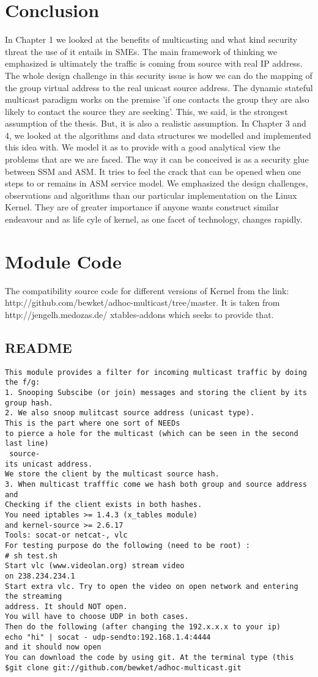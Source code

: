 \chapter{Conclusion}
In Chapter 1 we looked at the benefits of multicasting and what kind security
threat the use of it entails in SMEs. The main framework of thinking we emphasized
is ultimately the traffic is coming from source with real IP address. The whole
design challenge in this security issue is how we can do the mapping of the group
virtual address to the real unicast source address. The dynamic stateful multicast
paradigm works on the premise 'if one contacts the group they are also likely to
contact the source they are seeking'. This, we said, is the strongest assumption of
the thesis. But, it is also a realistic assumption.
In Chapter 3 and 4, we looked at the algorithms and data structures we modelled
and implemented this idea with. We model it as to provide with a good analytical
view the problems that are we are faced. The way it can be conceived is as a
security glue between SSM and ASM. It tries to feel the crack that can be opened
when one steps to or remains in ASM service model.
We emphasized the design challenges, observations and algorithms than our
particular implementation on the Linux Kernel. They are of greater importance if
anyone wants construct similar endeavour and as life cyle of kernel, as one facet of
technology, changes rapidly.
\appendix
\chapter{Module Code}
The compatibility source code for different versions of Kernel from the link:
http://github.com/bewket/adhoc-multicast/tree/master. It is taken from http://jengelh.medozas.de/ xtables-addons which seeks to provide that.
\section{README}
\begin{verbatim}
This module provides a filter for incoming multicast traffic by doing the f/g:
1. Snooping Subscibe (or join) messages and storing the client by its group hash.
2. We also snoop mulitcast source address (unicast type). 
This is the part where one sort of NEEDs
to pierce a hole for the multicast (which can be seen in the second last line)
 source-
its unicast address.
We store the client by the multicast source hash.
3. When multicast trafffic come we hash both group and source address and
Checking if the client exists in both hashes.
You need iptables >= 1.4.3 (x_tables module)
and kernel-source >= 2.6.17
Tools: socat-or netcat-, vlc
For testing purpose do the following (need to be root) :
# sh test.sh
Start vlc (www.videolan.org) stream video
on 238.234.234.1
Start extra vlc. Try to open the video on open network and entering the streaming
address. It should NOT open.
You will have to choose UDP in both cases.
Then do the following (after changing the 192.x.x.x to your ip)
echo "hi" | socat - udp-sendto:192.168.1.4:4444
and it should now open
You can download the code by using git. At the terminal type (this
$git clone git://github.com/bewket/adhoc-multicast.git
\end{verbatim}
